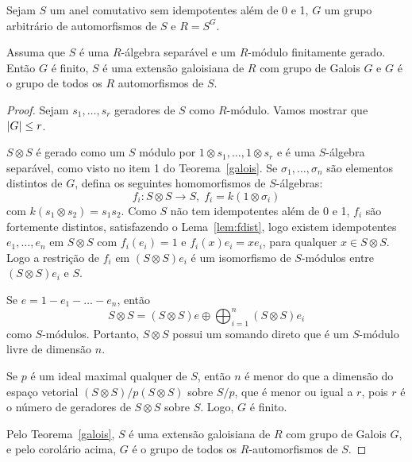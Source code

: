 \begin{teo}
Sejam $S$ um anel comutativo sem idempotentes além de 0 e 1, $G$ um grupo arbitrário de automorfismos de $S$ e $R=S^G$. \par Assuma que $S$ é uma $R$-álgebra separável e um $R$-módulo finitamente gerado. Então $G$ é finito, $S$ é uma extensão galoisiana de $R$ com grupo de Galois $G$ e $G$ é o grupo de todos os $R$ automorfismos de $S$.
\begin{proof}
Sejam $s_1, \dots, s_r$ geradores de $S$ como $R$-módulo. Vamos mostrar que $\left| G \right|\leq r$. \par 
$S\otimes S$ é gerado como um $S$ módulo por $1\otimes s_1, \dots, 1\otimes s_r$ e é uma $S$-álgebra separável, como visto no item 1 do Teorema~\ref{galois}. Se $\sigma_1, \dots, \sigma_n$ são elementos distintos de $G$, defina os seguintes homomorfismos de $S$-álgebras:\[f_i: S\otimes S \rightarrow S, \; f_i=k(1\otimes \sigma_i)\]com $k(s_1\otimes s_2) = s_1s_2$. Como $S$ não tem idempotentes além de 0 e 1, $f_i$ são fortemente distintos, satisfazendo o Lema~\ref{lem:fdist}, logo existem idempotentes $e_1, \dots, e_n$ em $S\otimes S$ com $f_i(e_i) = 1$ e $f_i(x) e_i = xe_i$, para qualquer $x \in S\otimes S$. Logo a restrição de $f_i$ em $(S\otimes S)e_i$ é um isomorfismo de $S$-módulos entre $(S\otimes S)e_i$ e $S$. \par 
Se $e= 1- e_1 - \dots - e_n$, então\[S\otimes S =  (S\otimes S)e \oplus \bigoplus_{i=1}^{n} \left(S\otimes S \right)e_i\]como $S$-módulos. Portanto, $S\otimes S$ possui um somando direto que é um $S$-módulo livre de dimensão $n$. \par 
Se $p$ é um ideal maximal qualquer de $S$, então $n$ é menor do que a dimensão do espaço vetorial $(S\otimes S)/p(S\otimes S)$ sobre $S/p$, que é menor ou igual a $r$, pois $r$ é o número de geradores de $S\otimes S$ sobre $S$. Logo, $G$ é finito. \par
Pelo Teorema~\ref{galois}, $S$ é uma extensão galoisiana de $R$ com grupo de Galois $G$, e pelo corolário acima, $G$ é o grupo de todos os $R$-automorfismos de $S$.
\end{proof}
\end{teo}

